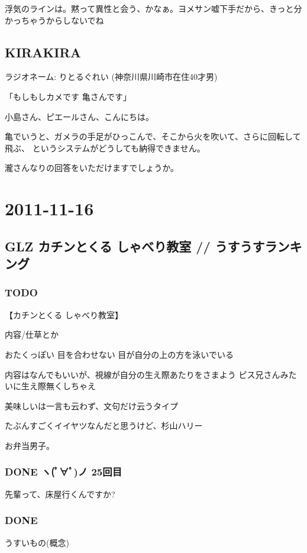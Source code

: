 \documentclass[11pt]{article}
\begin{document}
浮気のラインは。黙って異性と会う、かなぁ。ヨメサン嘘下手だから、きっと分かっちゃうからしないでね
\subsection{KIRAKIRA}
\label{sec-36_3}

ラジオネーム: りとるぐれい (神奈川県川崎市在住40才男)

「もしもしカメです 亀さんです」

小島さん、ピエールさん、こんにちは。

亀でいうと、ガメラの手足がひっこんで、そこから火を吹いて、さらに回転して飛ぶ、
というシステムがどうしても納得できません。

瀧さんなりの回答をいただけますでしょうか。
\section{2011-11-16}
\label{sec-37}
\subsection{GLZ カチンとくる しゃべり教室 // うすうすランキング}
\label{sec-37_1}
\subsubsection{\textbf{TODO}}
\label{sec-37_1_1}

【カチンとくる しゃべり教室】

内容/仕草とか

おたくっぽい
目を合わせない
目が自分の上の方を泳いでいる

内容はなんでもいいが、視線が自分の生え際あたりをさまよう
ピス兄さんみたいに生え際無くしちゃえ

美味しいは一言も云わず、文句だけ云うタイプ

たぶんすごくイイヤツなんだと思うけど、杉山ハリー

お弁当男子。
\subsubsection{\textbf{DONE} ヽ(ﾟ∀ﾟ)ノ 25回目}
\label{sec-37_1_2}

先輩って、床屋行くんですか?
\subsubsection{\textbf{DONE}}
\label{sec-37_1_3}

うすいもの(概念)
\end{document}
